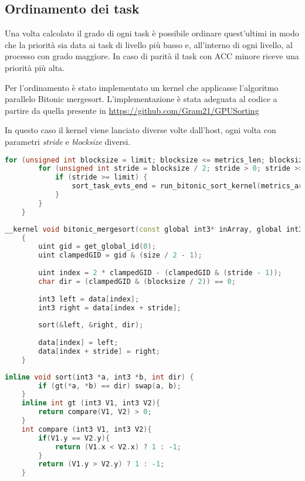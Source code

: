 \subsection{Ordinamento dei task}
Una volta calcolato il grado di ogni task è possibile ordinare quest'ultimi in modo che la priorità sia data ai task di livello più basso e, all'interno di ogni livello, al processo con grado maggiore.
In caso di parità il task con ACC minore riceve una priorità più alta.

Per l'ordinamento è stato implementato un kernel che applicasse l'algoritmo parallelo Bitonic mergesort. L'implementazione è stata adeguata al codice a partire da quella presente in \href{https://github.com/Gram21/GPUSorting/blob/master/Code/Sort.cl}{https://github.com/Gram21/GPUSorting}

In questo caso il kernel viene lanciato diverse volte dall'host, ogni volta con parametri \textit{stride} e \textit{blocksize} diversi.


\begin{lstlisting}[language=C++, caption={Bitonic mergesort host code},captionpos=b]
	for (unsigned int blocksize = limit; blocksize <= metrics_len; blocksize <<= 1) {
		for (unsigned int stride = blocksize / 2; stride > 0; stride >>= 1) {
			if (stride >= limit) {
				sort_task_evts_end = run_bitonic_sort_kernel(metrics_array_len, stride, blocksize);
			}
		}
	}
\end{lstlisting}

\begin{lstlisting}[language=C++, caption={Bitonic mergesort kernel for metrics array, source: \url{https://github.com/Gram21/GPUSorting}},captionpos=b]
	__kernel void bitonic_mergesort(const global int3* inArray, global int3* outArray, const uint size, const uint blocksize, const uint stride)
	{
		uint gid = get_global_id(0);
		uint clampedGID = gid & (size / 2 - 1);
		
		uint index = 2 * clampedGID - (clampedGID & (stride - 1));
		char dir = (clampedGID & (blocksize / 2)) == 0;
		
		int3 left = data[index];
		int3 right = data[index + stride];
		
		sort(&left, &right, dir);
		
		data[index] = left;
		data[index + stride] = right;
	}
\end{lstlisting}

\begin{lstlisting}[language=C++, caption={Sort utilities},captionpos=b]
	inline void sort(int3 *a, int3 *b, int dir) {
		if (gt(*a, *b) == dir) swap(a, b);
	}
	inline int gt (int3 V1, int3 V2){
		return compare(V1, V2) > 0;
	}
	int compare (int3 V1, int3 V2){
		if(V1.y == V2.y){
			return (V1.x < V2.x) ? 1 : -1;
		}
		return (V1.y > V2.y) ? 1 : -1;
	}
\end{lstlisting}

